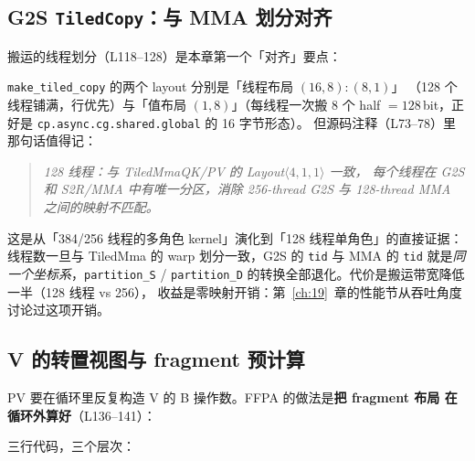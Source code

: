 \subsection{G2S \texttt{TiledCopy}：与 MMA 划分对齐}

搬运的线程划分（L118--128）是本章第一个「对齐」要点：



\texttt{make\_\allowbreak{}tiled\_\allowbreak{}copy} 的两个 layout 分别是「线程布局 $(16,8):(8,1)$」
（128 个线程铺满，行优先）与「值布局 $(1,8)$」（每线程一次搬 8 个 half
$=128$\,bit，正好是 \texttt{cp.\allowbreak{}async.\allowbreak{}cg.\allowbreak{}shared.\allowbreak{}global} 的 16 字节形态）。
但源码注释（L73--78）里那句话值得记：

\begin{quote}
  \textit{128 线程：与 TiledMmaQK/PV 的 Layout$\langle4,1,1\rangle$ 一致，
  每个线程在 G2S 和 S2R/MMA 中有唯一分区，消除 256-thread G2S 与
  128-thread MMA 之间的映射不匹配。}
\end{quote}

这是从「384/256 线程的多角色 kernel」演化到「128 线程单角色」的直接证据：
线程数一旦与 TiledMma 的 warp 划分一致，G2S 的 \texttt{tid} 与 MMA 的
\texttt{tid} 就是\emph{同一个坐标系}，\texttt{partition\_S} /
\texttt{partition\_D} 的转换全部退化。代价是搬运带宽降低一半（128 线程 vs 256），
收益是零映射开销：第~\ref{ch:19}~章的性能节从吞吐角度讨论过这项开销。

\subsection{V 的转置视图与 fragment 预计算}

PV 要在循环里反复构造 V 的 B 操作数。FFPA 的做法是\textbf{把 fragment 布局
在循环外算好}（L136--141）：



三行代码，三个层次：

